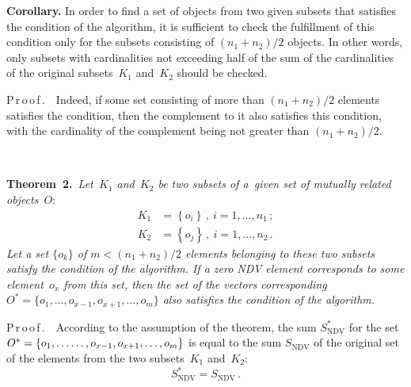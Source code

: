\begin{multicols}{2}
     \noindent
     \textbf{Corollary.} In order to find a set of objects from two given subsets 
that satisfies the condition of the algorithm, it is sufficient to check the fulfillment 
of this condition only for the subsets consisting of $(n_1+n_2)/2$ objects. In other 
words, only subsets with cardinalities not exceeding half of the sum of the 
cardinalities of the original subsets~$K_1$ and~$K_2$ should be checked.
     \smallskip
     
     \noindent
     P\,r\,o\,o\,f\,.\ \ Indeed, if some set consisting of more than $(n_1+n_2)/2$ 
elements satisfies the condition, then the complement to it also satisfies this 
condition, with the cardinality of the complement being not greater than 
$(n_1+n_2)/2$.

\begin{figure*}[b] %
\vspace*{1pt}
    \begin{center}  
  \mbox{%
 \epsfxsize=160.967mm 
 }
\end{center}
\vspace*{-10pt}
\end{figure*}

     
     \smallskip
     
     \noindent
     \textbf{Theorem~2.}\  \textit{Let~$K_1$ and~$K_2$ be two subsets of 
a~given set of mutually related objects~$O$}:
     \begin{align*}
     K_1 &= \left\{o_i\right\}\,,\ i=1,\ldots , n_1\,;\\
     K_2&= \left\{o_j\right\}\,,\ i=1,\ldots , n_2\,.
     \end{align*}
     \textit{Let a set $\{o_k\}$ of $m < (n_1 + n_2)/2$ elements belonging to 
these two subsets satisfy the condition of the algorithm. If a zero NDV element 
corresponds to some element~$o_x$ from this set, then the set of the vectors 
corresponding $O^*=\{o_1, \ldots, o_{x-1}, o_{x+1}, \ldots, o_m\}$ also satisfies the 
condition of the algorithm.}
     
     \smallskip
     
     \noindent
     P\,r\,o\,o\,f\,.\ \ According to the assumption of the theorem, the sum 
$S^*_{\mathrm{NDV}}$ for the set $O^*=\{o_1, \ldots\linebreak
\ldots, o_{x-1}, o_{x+1}, \ldots, o_m\}$ is 
equal to the sum $S_{\mathrm{NDV}}$ of the original set of the elements from the two 
subsets~$K_1$ and~$K_2$:
     $$
S^*_{\mathrm{NDV}} = S_{\mathrm{NDV}}\,.
$$
     

\end{multicols}
